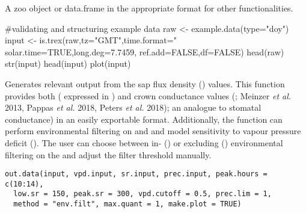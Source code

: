 \documentclass[a4paper]{book}
\begin{document}
%
\begin{Value}
A zoo object or data.frame in the appropriate format for other functionalities.
\end{Value}
%
\begin{Examples}
\begin{ExampleCode}
#validating and structuring example data
raw   <- example.data(type="doy")
input <- is.trex(raw,tz="GMT",time.format="%
    solar.time=TRUE,long.deg=7.7459,
    ref.add=FALSE,df=FALSE)
head(raw)
str(input)
head(input)
plot(input)
\end{ExampleCode}
\end{Examples}
%
\begin{Description}\relax
Generates relevant output from the sap flux density () values.
This function provides both  ( expressed in ) and crown conductance values
(; Meinzer \emph{et al.} 2013, Pappas \emph{et al.} 2018, Peters \emph{et al.} 2018); an analogue to stomatal conductance) in an easily exportable format.
Additionally, the function can perform environmental filtering on  and  and model  sensitivity to vapour pressure deficit ().
The user can choose between in- () or excluding () environmental filtering
on the  and adjust the filter threshold manually.
\end{Description}
%
\begin{Usage}
\begin{verbatim}
out.data(input, vpd.input, sr.input, prec.input, peak.hours = c(10:14),
  low.sr = 150, peak.sr = 300, vpd.cutoff = 0.5, prec.lim = 1,
  method = "env.filt", max.quant = 1, make.plot = TRUE)
\end{verbatim}
\end{Usage}
%
\end{document}
